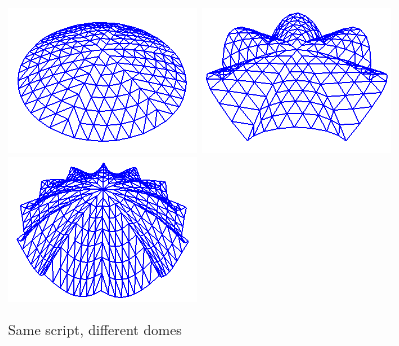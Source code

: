 \begin{figure}[ht]
  \centering
  \begin{makeimage}
  \end{makeimage}
  \begin{latexonly}
    \includegraphics[width=5cm]{images/scallopdome-000}
    \includegraphics[width=5cm]{images/scallopdome-001}
    \includegraphics[width=5cm]{images/scallopdome-002}
  \end{latexonly}
  \begin{htmlonly}
  \end{htmlonly}
  \caption{Same script, different domes} \label{fig:scallops}
\end{figure}



